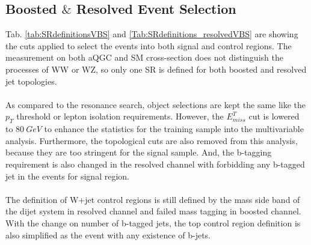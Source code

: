 \subsection{Boosted $\&$ Resolved Event Selection}
Tab. \ref{tab:SRdefinitionsVBS} and \ref{Tab:SRdefinitions_resolvedVBS} are showing the cuts applied to select the events into both signal and control regions. The measurement on both aQGC and SM cross-section does not distinguish the processes of WW or WZ, so only one SR is defined for both boosted and resolved jet topologies.
\\
\\As compared to the resonance search, object selections are kept the same like the $p_{T}$ threshold or lepton isolation requirements. However, the $E^{T}_{miss}$ cut is lowered to $80~GeV$ to enhance the statistics for the training sample into the multivariable analysis. Furthermore, the topological cuts are also removed from this analysis, because they are too stringent for the signal sample. And, the b-tagging requirement is also changed in the resolved channel with forbidding any b-tagged jet in the events for signal region. 
\\
\\The definition of W+jet control regions is still defined by the mass side band of the dijet system in resolved channel and failed mass tagging in boosted channel. With the change on number of b-tagged jets, the top control region definition is also simplified as the event with any existence of b-jets.  
